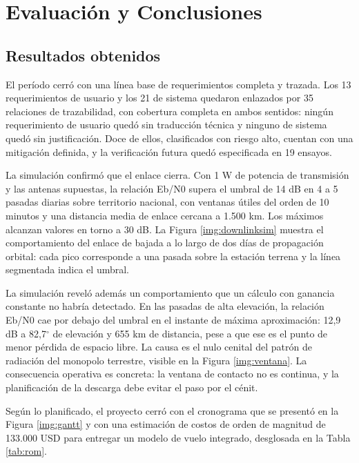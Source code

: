 \section{Evaluación y Conclusiones}

\subsection{Resultados obtenidos}

El período cerró con una línea base de requerimientos completa y trazada. Los 13 requerimientos de usuario y los 21 de sistema quedaron enlazados por 35 relaciones de trazabilidad, con cobertura completa en ambos sentidos: ningún requerimiento de usuario quedó sin traducción técnica y ninguno de sistema quedó sin justificación. Doce de ellos, clasificados con riesgo alto, cuentan con una mitigación definida, y la verificación futura quedó especificada en 19 ensayos.

La simulación confirmó que el enlace cierra. Con 1 W de potencia de transmisión y las antenas supuestas, la relación Eb/N0 supera el umbral de 14 dB en 4 a 5 pasadas diarias sobre territorio nacional, con ventanas útiles del orden de 10 minutos y una distancia media de enlace cercana a 1.500 km. Los máximos alcanzan valores en torno a 30 dB. La Figura \ref{img:downlinksim} muestra el comportamiento del enlace de bajada a lo largo de dos días de propagación orbital: cada pico corresponde a una pasada sobre la estación terrena y la línea segmentada indica el umbral.

La simulación reveló además un comportamiento que un cálculo con ganancia constante no habría detectado. En las pasadas de alta elevación, la relación Eb/N0 cae por debajo del umbral en el instante de máxima aproximación: 12,9 dB a 82,7$^{\circ}$ de elevación y 655 km de distancia, pese a que ese es el punto de menor pérdida de espacio libre. La causa es el nulo cenital del patrón de radiación del monopolo terrestre, visible en la Figura \ref{img:ventana}. La consecuencia operativa es concreta: la ventana de contacto no es continua, y la planificación de la descarga debe evitar el paso por el cénit.

Según lo planificado, el proyecto cerró con el cronograma que se presentó en la Figura \ref{img:gantt} y con una estimación de costos de orden de magnitud de 133.000 USD para entregar un modelo de vuelo integrado, desglosada en la Tabla \ref{tab:rom}.

